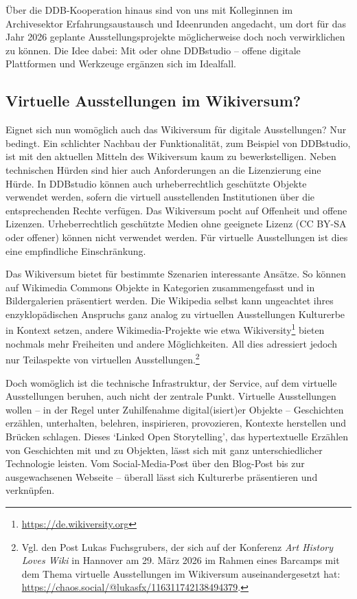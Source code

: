 \documentclass[a4paper,
fontsize=11pt,
oneside,
numbers=noperiodatend,
parskip=half-,
bibliography=totoc,
final
]{scrartcl}
\begin{document}
Über die DDB-Kooperation hinaus sind von uns mit Kolleginnen im
Archivesektor Erfahrungsaustausch und Ideenrunden angedacht, um dort für
das Jahr 2026 geplante Ausstellungsprojekte möglicherweise doch noch
verwirklichen zu können. Die Idee dabei: Mit oder ohne DDBstudio --
offene digitale Plattformen und Werkzeuge ergänzen sich im Idealfall.

\hypertarget{virtuelle-ausstellungen-im-wikiversum}{%
\subsection{Virtuelle Ausstellungen im
Wikiversum?}\label{virtuelle-ausstellungen-im-wikiversum}}

Eignet sich nun womöglich auch das Wikiversum für digitale
Ausstellungen? Nur bedingt. Ein schlichter Nachbau der Funktionalität,
zum Beispiel von DDBstudio, ist mit den aktuellen Mitteln des Wikiversum
kaum zu bewerkstelligen. Neben technischen Hürden sind hier auch
Anforderungen an die Lizenzierung eine Hürde. In DDBstudio können auch
urheberrechtlich geschützte Objekte verwendet werden, sofern die
virtuell ausstellenden Institutionen über die entsprechenden Rechte
verfügen. Das Wikiversum pocht auf Offenheit und offene Lizenzen.
Urheberrechtlich geschützte Medien ohne geeignete Lizenz (CC BY-SA oder
offener) können nicht verwendet werden. Für virtuelle Ausstellungen ist
dies eine empfindliche Einschränkung.

Das Wikiversum bietet für bestimmte Szenarien interessante Ansätze. So
können auf Wikimedia Commons Objekte in Kategorien zusammengefasst und
in Bildergalerien präsentiert werden. Die Wikipedia selbst kann
ungeachtet ihres enzyklopädischen Anspruchs ganz analog zu virtuellen
Ausstellungen Kulturerbe in Kontext setzen, andere Wikimedia-Projekte
wie etwa Wikiversity\footnote{\url{https://de.wikiversity.org}} bieten
nochmals mehr Freiheiten und andere Möglichkeiten. All dies adressiert
jedoch nur Teilaspekte von virtuellen Ausstellungen.\footnote{Vgl. den
  Post Lukas Fuchsgrubers, der sich auf der Konferenz \emph{Art History
  Loves Wiki} in Hannover am 29. März 2026 im Rahmen eines Barcamps mit
  dem Thema virtuelle Ausstellungen im Wikiversum auseinandergesetzt
  hat: \url{https://chaos.social/@lukasfx/116311742138494379}.}

Doch womöglich ist die technische Infrastruktur, der Service, auf dem
virtuelle Ausstellungen beruhen, auch nicht der zentrale Punkt.
Virtuelle Ausstellungen wollen -- in der Regel unter Zuhilfenahme
digital(isiert)er Objekte -- Geschichten erzählen, unterhalten,
belehren, inspirieren, provozieren, Kontexte herstellen und Brücken
schlagen. Dieses \enquote*{Linked Open Storytelling}, das hypertextuelle
Erzählen von Geschichten mit und zu Objekten, lässt sich mit ganz
unterschiedlicher Technologie leisten. Vom Social-Media-Post über den
Blog-Post bis zur ausgewachsenen Webseite -- überall lässt sich
Kulturerbe präsentieren und verknüpfen.
\end{document}

